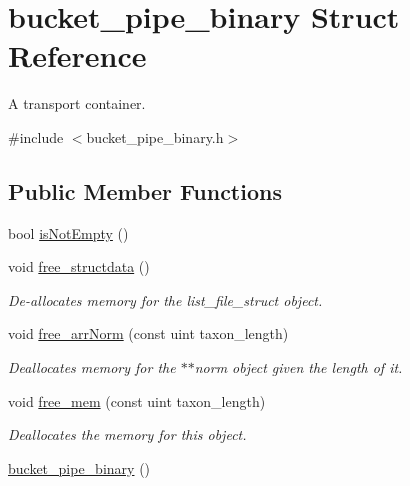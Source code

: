 \hypertarget{structbucket__pipe__binary}{
\section{bucket\_\-pipe\_\-binary Struct Reference}
\label{structbucket__pipe__binary}
}


A transport container.  




{\ttfamily \#include $<$bucket\_\-pipe\_\-binary.h$>$}

\subsection*{Public Member Functions}
\begin{DoxyCompactItemize}
\item 
bool \hyperlink{structbucket__pipe__binary_a65ffd12956a1412ee506667c8c88c2b0}{isNotEmpty} ()
\item 
\hypertarget{structbucket__pipe__binary_a4bfc07a62bcdae970e8deadc4bea2631}{
void \hyperlink{structbucket__pipe__binary_a4bfc07a62bcdae970e8deadc4bea2631}{free\_\-structdata} ()}
\label{structbucket__pipe__binary_a4bfc07a62bcdae970e8deadc4bea2631}

\begin{DoxyCompactList}\small\item\em De-\/allocates memory for the list\_\-file\_\-struct object. \end{DoxyCompactList}\item 
\hypertarget{structbucket__pipe__binary_a67dce1f84fe3564356a893111724a276}{
void \hyperlink{structbucket__pipe__binary_a67dce1f84fe3564356a893111724a276}{free\_\-arrNorm} (const uint taxon\_\-length)}
\label{structbucket__pipe__binary_a67dce1f84fe3564356a893111724a276}

\begin{DoxyCompactList}\small\item\em Deallocates memory for the $\ast$$\ast$norm object given the length of it. \end{DoxyCompactList}\item 
\hypertarget{structbucket__pipe__binary_ad5f36709083014abfdc0292c2698d247}{
void \hyperlink{structbucket__pipe__binary_ad5f36709083014abfdc0292c2698d247}{free\_\-mem} (const uint taxon\_\-length)}
\label{structbucket__pipe__binary_ad5f36709083014abfdc0292c2698d247}

\begin{DoxyCompactList}\small\item\em Deallocates the memory for this object. \end{DoxyCompactList}\item 
\hypertarget{structbucket__pipe__binary_a88f263509693d7291bb0bedaf33ee6ce}{
\hyperlink{structbucket__pipe__binary_a88f263509693d7291bb0bedaf33ee6ce}{bucket\_\-pipe\_\-binary} ()}
\label{structbucket__pipe__binary_a88f263509693d7291bb0bedaf33ee6ce}


\end{DoxyCompactItemize}
